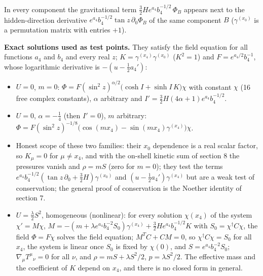 \documentclass[11pt]{article}
\begin{document}
In every component the gravitational term $\tfrac32He^{a_4}b_4^{-1/2}\,\Phi_B$ appears next to the hidden-direction derivative $e^{a_4}b_4^{-1/2}\tan z\,\partial_0\Phi_B$ of the same component $B$ ($\gamma^{(x_0)}$ is a permutation matrix with entries $+1$).

\textbf{Exact solutions used as test points.} They satisfy the field equation for all functions $a_4$ and $b_4$ and every real $z$; $K = \gamma^{(x_4)}\gamma^{(x_0)}$ ($K^2 = 1$) and $F = e^{a_4/2}b_4^{-1}$, whose logarithmic derivative is $-(u - \tfrac12a_4')$:

\begin{itemize}
\item $U = 0$, $m = 0$: $\Phi = F(\sin^2 z)^{\alpha/2}\big(\cosh I + \sinh I\,K\big)\chi$ with constant $\chi$ (16 free complex constants), $\alpha$ arbitrary and $I' = \tfrac32H(4\alpha + 1)e^{a_4}b_4^{-1/2}$.
\item $U = 0$, $\alpha = -\tfrac14$ (then $I' = 0$), $m$ arbitrary: $\Phi = F(\sin^2 z)^{-1/8}\big(\cos(mx_4) - \sin(mx_4)\gamma^{(x_4)}\big)\chi$.
\item Honest scope of these two families: their $x_0$ dependence is a real scalar factor, so $K_\mu = 0$ for $\mu \ne x_4$, and with the on-shell kinetic sum of section 8 the pressures vanish and $\rho = mS$ (zero for $m = 0$); they test the terms $e^{a_4}b_4^{-1/2}(\tan z\,\partial_0 + \tfrac32H)\gamma^{(x_0)}$ and $(u - \tfrac12a_4')\gamma^{(x_4)}$ but are a weak test of conservation; the general proof of conservation is the Noether identity of section 7.
\item $U = \tfrac{\lambda}{2}S^2$, homogeneous (nonlinear): for every solution $\chi(x_4)$ of the system $\chi' = M\chi$, $M = -(m + \lambda e^{a_4}b_4^{-2}S_0)\gamma^{(x_4)} + \tfrac32He^{a_4}b_4^{-1/2}K$ with $S_0 = \chi^\dagger C\chi$, the field $\Phi = F\chi$ solves the field equation; $M^TC + CM = 0$, so $\chi^\dagger C\chi = S_0$ for all $x_4$, the system is linear once $S_0$ is fixed by $\chi(0)$, and $S = e^{a_4}b_4^{-2}S_0$; $\nabla_\mu T^\mu{}_\nu = 0$ for all $\nu$, and $\rho = mS + \lambda S^2/2$, $p = \lambda S^2/2$. The effective mass and the coefficient of $K$ depend on $x_4$, and there is no closed form in general.
\end{itemize}
\end{document}

